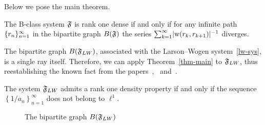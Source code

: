 \documentclass[12pt,oneside,a4paper]{amsart}
\begin{document}
    \bigskip
    Below we pose the main theorem.
    \begin{theorem}
      \label{thm-main}
      The B-class system $\mathfrak{F}$ is rank one dense if and only if
        for any infinite path $\{{r}_n\}_{n=1}^\infty$ in the bipartite graph $B(\mathfrak{F})$
        the series $\sum_{k=1}^\infty\lvert\mathrm{w}(r_k, r_{k+1})\rvert^{-1}$ diverges.
    \end{theorem}
    The bipartite graph $B(\mathfrak{F}_{LW})$, associated with the Larson--Wogen system~\eqref{lw-sys},
      is a single ray itself.
    Therefore, we can apply Theorem~\ref{thm-main} to $\mathfrak{F}_{LW}$, thus reestablishing
      the known fact from the papers~\cite{katavolos},~\cite{larson} and~\cite{argyroslambrou}.
    \begin{corol*}
      The system $\mathfrak{F}_{LW}$ admits a rank one density property if and only if
        the sequence $\left\{1/a_n\right\}_{n=1}^\infty$ does not belong to $\ell^1$.
    \end{corol*}
    \begin{figure}
      \begin{center}
      \caption{The bipartite graph $B(\mathfrak{F}_{LW})$ } \label{lw-bgraph}
      \end{center}
    \end{figure}
\end{document}
